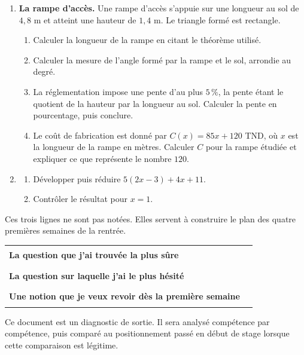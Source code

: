 \documentclass[10pt,a4paper]{article}
\begin{document}
\needspace{68mm}\par\vspace{3mm}
\begin{enumerate}
\needspace{22mm}
\item[\textbf{C1.}] \textbf{La rampe d'accès.} Une rampe d'accès s'appuie sur une longueur au sol de $4{,}8$ m
et atteint une hauteur de $1{,}4$ m. Le triangle formé est rectangle.
\begin{enumerate}
\item Calculer la longueur de la rampe en citant le théorème utilisé.
\item Calculer la mesure de l'angle formé par la rampe et le sol, arrondie au degré.
\item La réglementation impose une pente d'au plus $5\,\%$, la pente étant le quotient de la hauteur par la
longueur au sol. Calculer la pente en pourcentage, puis conclure.
\item Le coût de fabrication est donné par $C(x) = 85x + 120$ TND, où $x$ est la longueur de la rampe en mètres.
Calculer $C$ pour la rampe étudiée et expliquer ce que représente le nombre $120$.
\end{enumerate}
\par\vspace{1.2mm}
\needspace{22mm}
\item[\textbf{C2.}] \begin{enumerate}
\item Développer puis réduire $5(2x - 3) + 4x + 11$.
\item Contrôler le résultat pour $x = 1$.
\end{enumerate}
\par\vspace{1.2mm}
\end{enumerate}
\brouillon{\dimexpr\textheight/3\relax}
\newpage
{}
\begin{methodbox}Ces trois lignes ne sont pas notées. Elles servent à construire le plan des quatre premières semaines de la rentrée.\end{methodbox}
\par\noindent\begin{tabularx}{\linewidth}{>{\bfseries}p{62mm} X}
\toprule
La question que j'ai trouvée la plus sûre & \rule{85mm}{0.32pt} \\
La question sur laquelle j'ai le plus hésité & \rule{85mm}{0.32pt} \\
Une notion que je veux revoir dès la première semaine & \rule{85mm}{0.32pt} \\
\bottomrule\end{tabularx}
\vfill
\begin{graybox}\small Ce document est un diagnostic de sortie. Il sera analysé compétence par compétence, puis comparé au positionnement passé en début de stage lorsque cette comparaison est légitime.\end{graybox}
\end{document}
